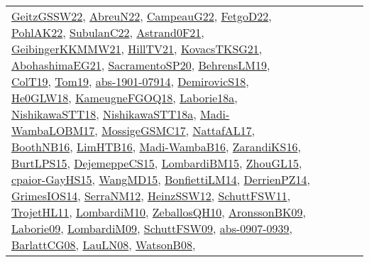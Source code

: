 {\begin{longtable}{lp{3cm}>{\raggedright}p{6cm}>{\raggedright}p{6cm}p{8cm}}
\href{papers/GeitzGSSW22.pdf}{GeitzGSSW22}\cite{GeitzGSSW22}, \href{articles/AbreuN22.pdf}{AbreuN22}\cite{AbreuN22}, \href{articles/CampeauG22.pdf}{CampeauG22}\cite{CampeauG22}, \href{articles/FetgoD22.pdf}{FetgoD22}\cite{FetgoD22}, \href{articles/PohlAK22.pdf}{PohlAK22}\cite{PohlAK22}, \href{articles/SubulanC22.pdf}{SubulanC22}\cite{SubulanC22}, \href{papers/Astrand0F21.pdf}{Astrand0F21}\cite{Astrand0F21}, \href{papers/GeibingerKKMMW21.pdf}{GeibingerKKMMW21}\cite{GeibingerKKMMW21}, \href{papers/HillTV21.pdf}{HillTV21}\cite{HillTV21}, \href{papers/KovacsTKSG21.pdf}{KovacsTKSG21}\cite{KovacsTKSG21}, \href{articles/AbohashimaEG21.pdf}{AbohashimaEG21}\cite{AbohashimaEG21}, \href{articles/SacramentoSP20.pdf}{SacramentoSP20}\cite{SacramentoSP20}, \href{papers/BehrensLM19.pdf}{BehrensLM19}\cite{BehrensLM19}, \href{papers/ColT19.pdf}{ColT19}\cite{ColT19}, \href{papers/Tom19.pdf}{Tom19}\cite{Tom19}, \href{articles/abs-1901-07914.pdf}{abs-1901-07914}\cite{abs-1901-07914}, \href{papers/DemirovicS18.pdf}{DemirovicS18}\cite{DemirovicS18}, \href{papers/He0GLW18.pdf}{He0GLW18}\cite{He0GLW18}, \href{papers/KameugneFGOQ18.pdf}{KameugneFGOQ18}\cite{KameugneFGOQ18}, \href{papers/Laborie18a.pdf}{Laborie18a}\cite{Laborie18a}, \href{papers/NishikawaSTT18.pdf}{NishikawaSTT18}\cite{NishikawaSTT18}, \href{papers/NishikawaSTT18a.pdf}{NishikawaSTT18a}\cite{NishikawaSTT18a}, \href{papers/Madi-WambaLOBM17.pdf}{Madi-WambaLOBM17}\cite{Madi-WambaLOBM17}, \href{papers/MossigeGSMC17.pdf}{MossigeGSMC17}\cite{MossigeGSMC17}, \href{articles/NattafAL17.pdf}{NattafAL17}\cite{NattafAL17}, \href{papers/BoothNB16.pdf}{BoothNB16}\cite{BoothNB16}, \href{papers/LimHTB16.pdf}{LimHTB16}\cite{LimHTB16}, \href{papers/Madi-WambaB16.pdf}{Madi-WambaB16}\cite{Madi-WambaB16}, \href{articles/ZarandiKS16.pdf}{ZarandiKS16}\cite{ZarandiKS16}, \href{papers/BurtLPS15.pdf}{BurtLPS15}\cite{BurtLPS15}, \href{papers/DejemeppeCS15.pdf}{DejemeppeCS15}\cite{DejemeppeCS15}, \href{papers/LombardiBM15.pdf}{LombardiBM15}\cite{LombardiBM15}, \href{papers/ZhouGL15.pdf}{ZhouGL15}\cite{ZhouGL15}, \href{papers/cpaior-GayHS15.pdf}{cpaior-GayHS15}\cite{cpaior-GayHS15}, \href{articles/WangMD15.pdf}{WangMD15}\cite{WangMD15}, \href{papers/BonfiettiLM14.pdf}{BonfiettiLM14}\cite{BonfiettiLM14}, \href{papers/DerrienPZ14.pdf}{DerrienPZ14}\cite{DerrienPZ14}, \href{articles/GrimesIOS14.pdf}{GrimesIOS14}\cite{GrimesIOS14}, \href{papers/SerraNM12.pdf}{SerraNM12}\cite{SerraNM12}, \href{articles/HeinzSSW12.pdf}{HeinzSSW12}\cite{HeinzSSW12}, \href{articles/SchuttFSW11.pdf}{SchuttFSW11}\cite{SchuttFSW11}, \href{articles/TrojetHL11.pdf}{TrojetHL11}\cite{TrojetHL11}, \href{papers/LombardiM10.pdf}{LombardiM10}\cite{LombardiM10}, \href{articles/ZeballosQH10.pdf}{ZeballosQH10}\cite{ZeballosQH10}, \href{papers/AronssonBK09.pdf}{AronssonBK09}\cite{AronssonBK09}, \href{papers/Laborie09.pdf}{Laborie09}\cite{Laborie09}, \href{papers/LombardiM09.pdf}{LombardiM09}\cite{LombardiM09}, \href{papers/SchuttFSW09.pdf}{SchuttFSW09}\cite{SchuttFSW09}, \href{articles/abs-0907-0939.pdf}{abs-0907-0939}\cite{abs-0907-0939}, \href{papers/BarlattCG08.pdf}{BarlattCG08}\cite{BarlattCG08}, \href{papers/LauLN08.pdf}{LauLN08}\cite{LauLN08}, \href{papers/WatsonB08.pdf}{WatsonB08}\cite{WatsonB08}, 
\end{longtable}}
